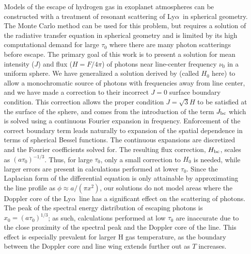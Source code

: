 \documentclass{aastex63}
\newcommand\lya{Ly$\alpha$\ }
\begin{document}
Models of the escape of hydrogen gas in exoplanet atmospheres can be constructed with a treatment of resonant scattering of \lya in spherical geometry. The Monte Carlo method can be used for this problem, but requires a solution of the radiative transfer equation in spherical geometry and is limited by its high computational demand for large $\tau_0$ where there are many photon scatterings before escape. The primary goal of this work is to present a solution for mean intensity ($J$) and flux ($H = F/4\pi$) of photons near line-center frequency $\nu_0$ in a uniform sphere. We have generalized a solution derived by \cite{2006ApJ...649...14D} (called $H_0$ here) to allow a monochromatic source of photons with frequencies away from line center, and we have made a correction to their incorrect $J=0$ surface boundary condition. This correction allows the proper condition $J=\sqrt{3}H$ to be satisfied at the surface of the sphere, and comes from the introduction of the term $J_{\rm bc}$ which is solved using a continuous Fourier expansion in frequency. Enforcement of the correct boundary term leads naturally to expansion of the spatial dependence in terms of spherical Bessel functions. The continuous expansions are discretized and the Fourier coefficients solved for. The resulting flux correction, $H_{\rm bc}$, scales as $(a\tau_0)^{-1/3}$. Thus, for large $\tau_0$, only a small correction to $H_0$ is needed, while larger errors are present in calculations performed at lower $\tau_0$. Since the Laplacian form of the differential equation is only attainable by approximating the line profile as $\phi \approx a/(\pi x^2)$, our solutions do not model areas where the Doppler core of the \lya line has a significant effect on the scattering of photons. The peak of the spectral energy distribution of escaping photons is $x_0 = (a\tau_0)^{1/3}$; as such, calculations performed at low $\tau_0$ are inaccurate due to the close proximity of the spectral peak and the Doppler core of the line. This effect is especially prevalent for larger H gas temperature, as the boundary between the Doppler core and line wing extends further out as $T$ increases.
\end{document}

